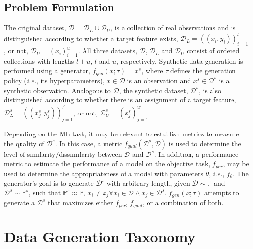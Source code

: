 
\subsection{Problem Formulation}\label{sec:problem-formulation-synth}

The original dataset, $\mathcal{D} = \mathcal{D}_L \cup \mathcal{D}_U$,
is a collection of real observations and is distinguished according to whether
a target feature exists, $\mathcal{D}_L = {((x_i, y_i))}^l_{i=1}$, or not,
$\mathcal{D}_U = {(x_i)}^{u}_{i=1}$. All three datasets, $\mathcal{D}$,
$\mathcal{D}_L$ and $\mathcal{D}_U$ consist of ordered collections with
lengths $l+u$, $l$ and $u$, respectively. Synthetic data generation is
performed using a generator, $f_{gen}(x;\tau) = x^s$, where $\tau$
defines the generation policy (\textit{i.e.}, its hyperparameters), $x \in
\mathcal{D}$ is an observation and $x^s \in \mathcal{D}^s$ is a
synthetic observation. Analogous to $\mathcal{D}$, the synthetic dataset,
$\mathcal{D}^s$, is also distinguished according to whether there is an
assignment of a target feature, $\mathcal{D}^s_L = {((x^s_j,
y^s_j))}^{l'}_{j=1}$, or not, $\mathcal{D}^s_U =
{(x^s_j)}^{u'}_{j=1}$.

Depending on the ML task, it may be relevant to establish metrics to measure
the quality of $\mathcal{D}^s$. In this case, a metric
$f_{qual}(\mathcal{D}^s, \mathcal{D})$ is used to determine the level of
similarity/dissimilarity between $\mathcal{D}$ and $\mathcal{D}^s$. In
addition, a performance metric to estimate the performance of a model on the
objective task, $f_{per}$, may be used to determine the appropriateness of a
model with parameters $\theta$, \textit{i.e.}, $f_{\theta}$. The generator's
goal is to generate $\mathcal{D}^s$ with arbitrary length, given
$\mathcal{D} \sim \mathbb{P}$ and $\mathcal{D}^s \sim \mathbb{P}^s$, such
that $\mathbb{P}^s \approx \mathbb{P}$, $x_i \neq x_j \forall x_i \in
\mathcal{D} \wedge x_j \in \mathcal{D}^s$. $f_{gen}(x;\tau)$ attempts to
generate a $\mathcal{D}^s$ that maximizes either $f_{per}$, $f_{qual}$, or a
combination of both.


\section{Data Generation Taxonomy}\label{sec:taxonomy-synth}

